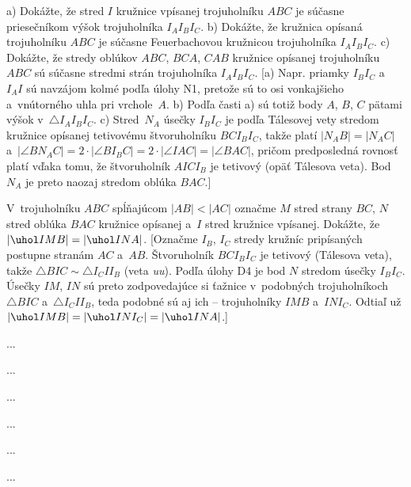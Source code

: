 {a) Dokážte, že stred $I$ kružnice vpísanej trojuholníku $ABC$ je súčasne priesečníkom výšok trojuholníka $I_AI_BI_C$.
b) Dokážte, že kružnica opísaná trojuholníku $ABC$ je súčasne Feuerbachovou kružnicou
trojuholníka $I_AI_BI_C$. c) Dokážte, že stredy oblúkov $ABC$, $BCA$, $CAB$ kružnice opísanej trojuholníku $ABC$ sú súčasne stredmi strán trojuholníka $I_AI_BI_C$.
 [a) Napr. priamky $I_BI_C$ a~$I_AI$ sú navzájom kolmé podľa úlohy N1, pretože sú to osi vonkajšieho a~vnútorného uhla pri vrchole~$A$.
 b) Podľa časti a) sú totiž body $A$, $B$, $C$ pätami výšok v~$\triangle I_AI_BI_C$.
 c) Stred~$N_A$ úsečky $I_BI_C$ je podľa Tálesovej vety stredom kružnice opísanej tetivovému štvoruholníku $BCI_BI_C$, takže platí $|N_AB|=|N_AC|$ a~$|\angle BN_AC|=2\cdot |\angle BI_BC|=2\cdot |\angle IAC|=|\angle BAC|$, pričom predposledná rovnosť platí vďaka tomu, že štvoruholník $AICI_B$ je tetivový (opäť Tálesova veta). Bod $N_A$ je preto naozaj stredom oblúka $BAC$.]
 \obrplus{}%

V~trojuholníku $ABC$ spĺňajúcom $|AB|<|AC|$ označme $M$ stred strany $BC$, $N$ stred oblúka $BAC$ kružnice opísanej a~$I$ stred kružnice vpísanej. Dokážte, že
$|\uhol IMB|=|\uhol INA|$.
 [Označme $I_B$, $I_C$ stredy kružníc pripísaných postupne stranám $AC$ a~$AB$.
 Štvoruholník $BCI_BI_C$ je tetivový (Tálesova veta), takže $\triangle BIC \sim \triangle I_CII_B$ (veta {\it uu}). Podľa úlohy D4 je bod $N$ stredom úsečky $I_BI_C$. Úsečky $IM$, $IN$ sú preto zodpovedajúce si ťažnice v~podobných trojuholníkoch $\triangle BIC$ a~$\triangle I_CII_B$, teda podobné sú aj ich  -- trojuholníky $IMB$ a~$INI_C$. Odtiaľ už
 $|\uhol IMB|=|\uhol INI_C|=|\uhol INA|$.]

}

{%
...}

{%
...}

{%
...}

{%
...}

{%
...}

{%
...}

